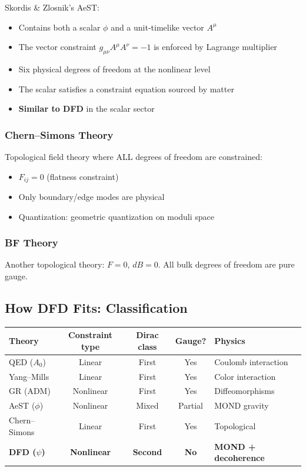 \documentclass[11pt,a4paper]{article}
\begin{document}
Skordis \& Zlosnik's AeST:
\begin{itemize}
\item Contains both a scalar $\phi$ and a unit-timelike vector $A^\mu$
\item The vector constraint $g_{\mu\nu}A^\mu A^\nu = -1$ is enforced by Lagrange multiplier
\item Six physical degrees of freedom at the nonlinear level
\item The scalar satisfies a constraint equation sourced by matter
\item \textbf{Similar to DFD} in the scalar sector
\end{itemize}

\subsubsection{Chern--Simons Theory}

Topological field theory where ALL degrees of freedom are constrained:
\begin{itemize}
\item $F_{ij} = 0$ (flatness constraint)
\item Only boundary/edge modes are physical
\item Quantization: geometric quantization on moduli space
\end{itemize}

\subsubsection{BF Theory}

Another topological theory: $F = 0$, $dB = 0$. All bulk degrees of freedom are pure gauge.

\subsection{How DFD Fits: Classification}

\begin{center}
\begin{tabular}{lcccl}
\toprule
\textbf{Theory} & \textbf{Constraint type} & \textbf{Dirac class} & \textbf{Gauge?} & \textbf{Physics} \\
\midrule
QED ($A_0$) & Linear & First & Yes & Coulomb interaction \\
Yang--Mills & Linear & First & Yes & Color interaction \\
GR (ADM) & Nonlinear & First & Yes & Diffeomorphisms \\
AeST ($\phi$) & Nonlinear & Mixed & Partial & MOND gravity \\
Chern--Simons & Linear & First & Yes & Topological \\
\textbf{DFD ($\psi$)} & \textbf{Nonlinear} & \textbf{Second} & \textbf{No} & \textbf{MOND + decoherence} \\
\bottomrule
\end{tabular}
\end{center}
\end{document}
